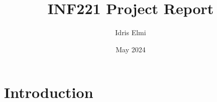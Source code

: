 \documentclass{article}
\title{INF221 Project Report}
\author{Idris Elmi}
\date{May 2024}
\begin{document}
\maketitle

\section{Introduction}
\end{document}

